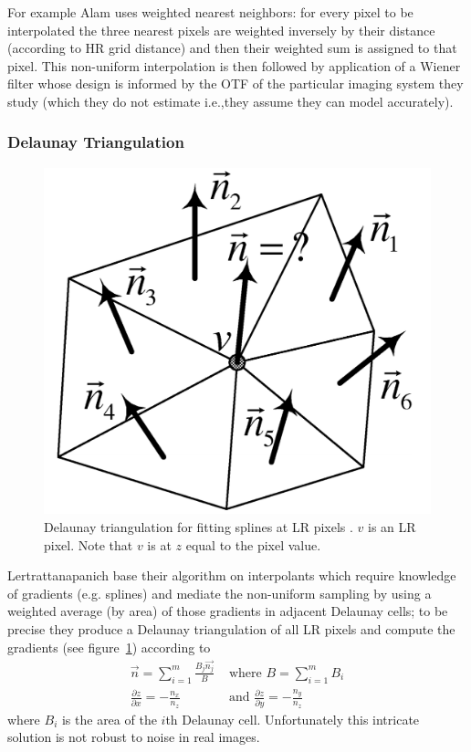 For example Alam  \cite{Alam2000} uses weighted nearest neighbors: for every pixel to be interpolated the three nearest pixels are weighted inversely by their distance (according to HR grid distance) and then their weighted sum is assigned to that pixel.
%
This non-uniform interpolation is then followed by application of a Wiener filter whose design is informed by the OTF of the particular imaging system they study (which they do not estimate i.e.,they assume they can model accurately).
%
\subsubsection{Delaunay Triangulation}

\begin{figure}[!htbp]
    \centering
    \includegraphics[width=.7\linewidth]{figures/classical/delauney.png}
    \caption{Delaunay triangulation for fitting splines at LR pixels \cite{Lertrattanapanich}. \(v\) is an LR pixel. Note that \(v\) is at \(z\) equal to the pixel value.}
    \label{fig:delauney}
\end{figure}
Lertrattanapanich  \cite{Lertrattanapanich} base their algorithm on interpolants which require knowledge of gradients (e.g. splines) and mediate the non-uniform sampling by using a weighted average (by area) of those gradients in adjacent Delaunay cells; to be precise they produce a Delaunay triangulation of all LR pixels and compute the gradients (see figure~\ref{fig:delauney}) according to
\begin{align*}
    \vec{n} = \sum_{i=1}^m \frac{B_j \vec{n_j}}{B}   & \text{ where } B=\sum_{i=1}^m B_i                              \\
    \frac{\partial z}{\partial x} = -\frac{n_x}{n_z} & \text{ and }  \frac{\partial z}{\partial y} = -\frac{n_y}{n_z}
\end{align*}
where \(B_i\) is the area of the \(i\)th Delaunay cell.
%
Unfortunately this intricate solution is not robust to noise in real images.
